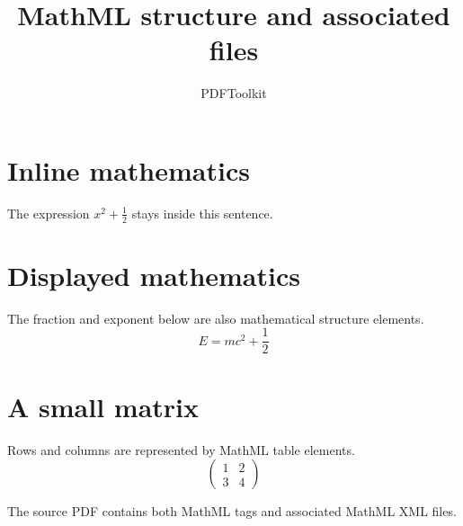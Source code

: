 \documentclass{article}
\title{MathML structure and associated files}
\author{PDFToolkit}
\date{}
\begin{document}
\maketitle
\thispagestyle{empty}

\section{Inline mathematics}
The expression $x^{2}+\frac{1}{2}$ stays inside this sentence.

\section{Displayed mathematics}
The fraction and exponent below are also mathematical structure elements.
\[
E=mc^{2}+\frac{1}{2}
\]

\section{A small matrix}
Rows and columns are represented by MathML table elements.
\[
\begin{pmatrix}1&2\\3&4\end{pmatrix}
\]

The source PDF contains both MathML tags and associated MathML XML files.
\end{document}
